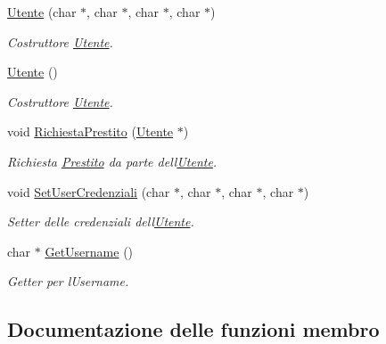 \begin{DoxyCompactItemize}
\item 
\mbox{\label{class_utente_ab1a579bcfe63412f3865c95c0b5802ee}} 
\mbox{\hyperlink{class_utente_ab1a579bcfe63412f3865c95c0b5802ee}{Utente}} (char $\ast$, char $\ast$, char $\ast$, char $\ast$)
\begin{DoxyCompactList}\small\item\em Costruttore \mbox{\hyperlink{class_utente}{Utente}}. \end{DoxyCompactList}\item 
\mbox{\label{class_utente_a387f9b8358c4a8e99b9ce54332632ba5}} 
\mbox{\hyperlink{class_utente_a387f9b8358c4a8e99b9ce54332632ba5}{Utente}} ()
\begin{DoxyCompactList}\small\item\em Costruttore \mbox{\hyperlink{class_utente}{Utente}}. \end{DoxyCompactList}\item 
void \mbox{\hyperlink{class_utente_a6041323415b0cb311ab2564afdd6a13b}{Richiesta\+Prestito}} (\mbox{\hyperlink{class_utente}{Utente}} $\ast$)
\begin{DoxyCompactList}\small\item\em Richiesta \mbox{\hyperlink{class_prestito}{Prestito}} da parte dell\textquotesingle{}\mbox{\hyperlink{class_utente}{Utente}}. \end{DoxyCompactList}\item 
void \mbox{\hyperlink{class_utente_a42d4d04d073063464cf24d74723c0ba8}{Set\+User\+Credenziali}} (char $\ast$, char $\ast$, char $\ast$, char $\ast$)
\begin{DoxyCompactList}\small\item\em Setter delle credenziali dell\textquotesingle{}\mbox{\hyperlink{class_utente}{Utente}}. \end{DoxyCompactList}\item 
char $\ast$ \mbox{\hyperlink{class_utente_a9964d28e9b592fd7c430a55f09856727}{Get\+Username}} ()
\begin{DoxyCompactList}\small\item\em Getter per l\textquotesingle{}Username. \end{DoxyCompactList}\end{DoxyCompactItemize}


\subsection{Documentazione delle funzioni membro}
\mbox{\label{class_utente_a9964d28e9b592fd7c430a55f09856727}} 
